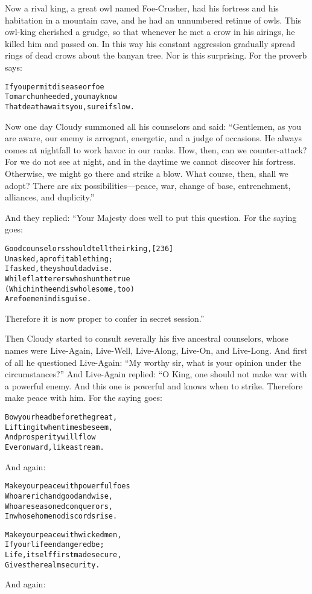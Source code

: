 \documentclass{article}
\renewenvironment{verbatim}{\begin{alltt}\normalfont\begin{centering}}{\end{centering}\end{alltt}}
\begin{document}
Now a rival king, a great owl named Foe-Crusher, had his fortress
and his habitation in a mountain cave, and he had an unnumbered
retinue of owls. This owl-king cherished a grudge, so that whenever
he met a crow in his airings, he killed him and passed on. In this
way his constant aggression gradually spread rings of dead crows
about the banyan tree. Nor is this surprising. For the proverb
says:

\begin{verbatim}
If you permit disease or foe
To march unheeded, you may know
That death awaits you, sure if slow.
\end{verbatim}
Now one day Cloudy summoned all his counselors and said:
``Gentlemen, as you are aware, our enemy is arrogant, energetic, and a judge of occasions. He always comes at nightfall to work havoc in our ranks. How, then, can we counter-attack? For we do not see at night, and in the daytime we cannot discover his fortress. Otherwise, we might go there and strike a blow. What course, then, shall we adopt? There are six possibilities---peace, war, change of base, entrenchment, alliances, and duplicity.''

And they replied: “Your Majesty does well to put this question. For
the saying goes:

\begin{verbatim}
Good counselors should tell their king,                 [236]
Unasked, a profitable thing;
    If asked, they should advise.
While flatterers who shun the true
(Which in the end is wholesome, too)
    Are foemen in disguise.
\end{verbatim}
Therefore it is now proper to confer in secret session.”

Then Cloudy started to consult severally his five ancestral
counselors, whose names were Live-Again, Live-Well, Live-Along,
Live-On, and Live-Long. And first of all he questioned Live-Again:
``My worthy sir, what is your opinion under the circumstances?''
And Live-Again replied: “O King, one should not make war with a
powerful enemy. And this one is powerful and knows when to strike.
Therefore make peace with him. For the saying goes:

\begin{verbatim}
Bow your head before the great,
    Lifting it when times beseem,
And prosperity will flow
    Ever onward, like a stream.
\end{verbatim}
And again:

\begin{verbatim}
Make your peace with powerful foes
    Who are rich and good and wise,
Who are seasoned conquerors,
In whose home no discords rise.

Make your peace with wicked men,
    If your life endangered be;
Life, itself first made secure,
    Gives the realm security.
\end{verbatim}
And again:
\end{document}
